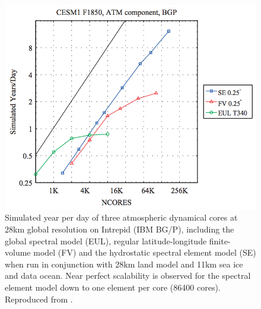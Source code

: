 \documentclass[11pt]{article}
\begin{document}
\begin{figure}
\begin{center}
\includegraphics[width=5in]{CAMSEScalability.png}
\end{center}
\caption{Simulated year per day of three atmospheric dynamical cores at 28km global resolution on Intrepid (IBM BG/P), including the global spectral model (EUL), regular latitude-longitude finite-volume model (FV) and the hydrostatic spectral element model (SE) when run in conjunction with 28km land model and 11km sea ice and data ocean.  Near perfect scalability is observed for the spectral element model down to one element per core (86400 cores).  Reproduced from \cite{JDJEKJEONGetal2011IJHPCA}.}
\end{figure}
\end{document}
